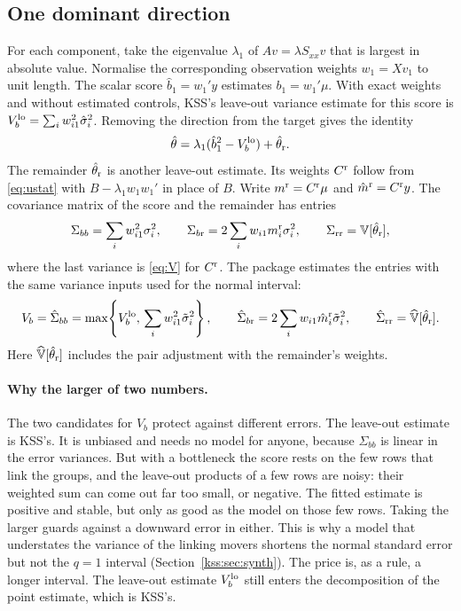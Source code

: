 \subsection{One dominant direction}\label{sec:q1int}
For each component, take the eigenvalue $\lambda_1$ of $Av=\lambda S_{xx}v$
that is largest in absolute value. Normalise the corresponding observation
weights $w_1=Xv_1$ to unit length. The scalar score $\hat b_1=w_1'y$
estimates $b_1=w_1'\mu$. With exact weights and without estimated controls,
KSS's leave-out variance estimate for this score is
$V_b^{\rm lo}=\sum_i w_{i1}^2\hat\sigma_i^2$. Removing the direction from
the target gives the identity
\[
  \hat\theta=\lambda_1(\hat b_1^2-V_b^{\rm lo})+\hat\theta_{\rm r}.
\]
The remainder $\hat\theta_{\rm r}$ is another leave-out estimate. Its weights
$C^{\rm r}$ follow from \eqref{eq:ustat} with $B-\lambda_1w_1w_1'$ in place of
$B$. Write $m^{\rm r}=C^{\rm r}\mu$ and $\hat m^{\rm r}=C^{\rm r}y$.
The covariance matrix of the score and the remainder has entries
\begin{equation}\label{eq:q1cov}
 \Sigma_{bb}=\sum_i w_{i1}^2\sigma_i^2,\qquad
 \Sigma_{b{\rm r}}=2\sum_i w_{i1}m_i^{\rm r}\sigma_i^2,\qquad
 \Sigma_{\rm rr}=\mathbb{V}[\hat\theta_{\rm r}],
\end{equation}
where the last variance is \eqref{eq:V} for $C^{\rm r}$. The package estimates
the entries with the same variance inputs used for the normal interval:
\begin{equation}\label{eq:q1est}
 V_b=\hat\Sigma_{bb}=\max\!\left\{V_b^{\rm lo},\,\sum_i w_{i1}^2\tilde\sigma_i^2\right\},
 \qquad \hat\Sigma_{b{\rm r}}=2\sum_i w_{i1}\hat m_i^{\rm r}\tilde\sigma_i^2,\qquad
 \hat\Sigma_{\rm rr}=\widehat{\mathbb{V}}[\hat\theta_{\rm r}].
\end{equation}
Here $\widehat{\mathbb{V}}[\hat\theta_{\rm r}]$ includes the pair adjustment with the
remainder's weights.

\paragraph{Why the larger of two numbers.}
The two candidates for $V_b$ protect against different errors. The leave-out
estimate is KSS's. It is unbiased and needs no model for anyone, because
$\Sigma_{bb}$ is linear in the error variances. But with a bottleneck the score rests
on the few rows that link the groups, and the leave-out products of a few rows are
noisy: their weighted sum can come out far too small, or negative. The fitted estimate
is positive and stable, but only as good as the model on those few rows. Taking the
larger guards against a downward error in either. This is why a model that understates
the variance of the linking movers shortens the normal standard error but not the
$q=1$ interval (Section~\ref{kss:sec:synth}). The price is, as a rule, a longer
interval. The leave-out estimate $V_b^{\rm lo}$ still enters the decomposition of the
point estimate, which is KSS's.


